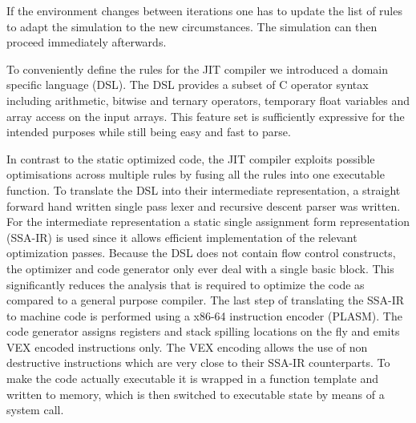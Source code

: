 If the environment changes between iterations one has to update the list of rules to adapt the simulation to the new circumstances.
The simulation can then proceed immediately afterwards.

To conveniently define the rules for the JIT compiler we introduced a domain specific language (DSL). The DSL provides a subset of C operator syntax including arithmetic, bitwise and ternary operators, temporary float variables and array access on the input arrays. This feature set is sufficiently expressive for the intended purposes while still being easy and fast to parse.

In contrast to the static optimized code, the JIT compiler exploits possible optimisations across multiple rules by fusing all the rules into one executable function. %
To translate the DSL into their intermediate representation, a straight forward hand written single pass lexer and recursive descent parser was written. %
For the intermediate representation a static single assignment form representation (SSA-IR)\cite[Chapter~6.2.4]{dragon}\cite{LuaJITir} is used since it allows efficient implementation of the relevant optimization passes. Because the DSL does not contain flow control constructs, the optimizer and code generator only ever deal with a single basic block. This significantly reduces the analysis that is required to optimize the code as compared to a general purpose compiler. The last step of translating the SSA-IR to machine code is performed using a x86-64 instruction encoder (PLASM). The code generator assigns registers and stack spilling locations on the fly and emits VEX encoded instructions only. The VEX encoding allows the use of non destructive instructions which are very close to their SSA-IR counterparts. To make the code actually executable it is wrapped in a function template and written to memory, which is then switched to executable state by means of a system call.



